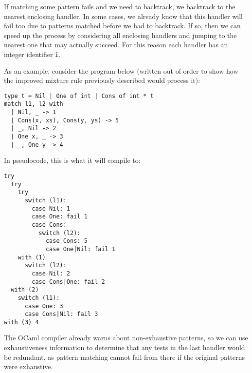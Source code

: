 

If matching some pattern fails and we need to backtrack, we backtrack to the nearest enclosing handler. In some cases, we already know that this handler will fail too due to patterns matched before we had to backtrack. If so, then we can speed up the process by considering all enclosing handlers and jumping to the nearest one that may actually succeed. For this reason each handler has an integer identifier \verb|i|.

As an example, consider the program below (written out of order to show how the improved mixture rule previously described would process it): %
\begin{verbatim}
type t = Nil | One of int | Cons of int * t
match l1, l2 with
  | Nil, _ -> 1
  | Cons(x, xs), Cons(y, ys) -> 5
  | _, Nil -> 2
  | One x, _ -> 3
  | _, One y -> 4
\end{verbatim} %

In pseudocode, this is what it will compile to:  %
\begin{verbatim}
try
  try
    try
      switch (l1):
        case Nil: 1
        case One: fail 1
        case Cons:
          switch (l2):
            case Cons: 5
            case One|Nil: fail 1
    with (1)
      switch (l2):
        case Nil: 2
        case Cons|One: fail 2
  with (2)
    switch (l1):
      case One: 3
      case Cons|Nil: fail 3
with (3) 4
\end{verbatim}

The OCaml compiler already warns about non-exhaustive patterns, so we can use exhaustiveness information to determine that any tests in the last handler would be redundant, as pattern matching cannot fail from there if the original patterns were exhaustive.

